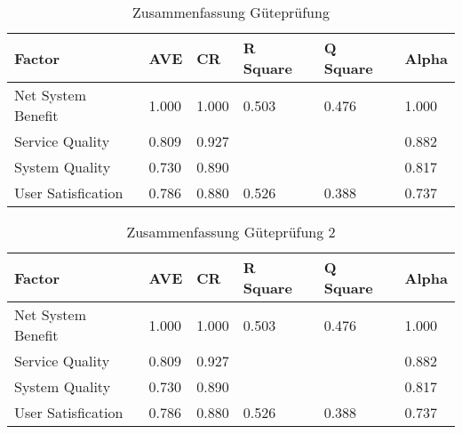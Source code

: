 \begin{table}[h] 
\caption{Zusammenfassung G\"utepr\"ufung}
\label{tab:Zusammenfassung} 
\begin{tabular}{|l|l|l|l|l|l|}
  \hline
\textbf{Factor} & \textbf{AVE} & \textbf{CR} & \textbf{R Square} & \textbf{Q Square} & \textbf{Alpha} \\
  \hline
 Net System Benefit & 1.000 & 1.000 & 0.503 & 0.476 & 1.000 \\
  \hline 
 Service Quality & 0.809 & 0.927 & & & 0.882 \\
  \hline
 System Quality & 0.730 & 0.890 & & & 0.817 \\
  \hline
 User Satisfication & 0.786 & 0.880 & 0.526 & 0.388 & 0.737 \\ 
 \hline
\end{tabular}	
\end{table}


\begin{table}[h] 
\caption{Zusammenfassung G\"utepr\"ufung 2}
\label{tab:Zusammenfassung} 
\begin{tabular}{@{}llllll@{}} \toprule

\textbf{Factor} & \textbf{AVE} & \textbf{CR} & \textbf{R Square} & \textbf{Q Square} & \textbf{Alpha} \\ \midrule

 Net System Benefit & 1.000 & 1.000 & 0.503 & 0.476 & 1.000 \\
 
 Service Quality & 0.809 & 0.927 & & & 0.882 \\

 System Quality & 0.730 & 0.890 & & & 0.817 \\

 User Satisfication & 0.786 & 0.880 & 0.526 & 0.388 & 0.737 \\ \bottomrule
\end{tabular}	
\end{table}